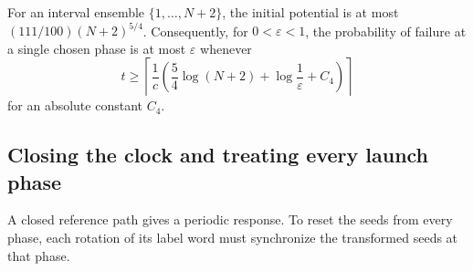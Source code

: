 For an interval ensemble $\{1,\ldots,N+2\}$, the initial potential
is at most $(111/100)(N+2)^{5/4}$. Consequently, for
$0<\varepsilon<1$, the probability of failure at a single chosen
phase is at most $\varepsilon$ whenever
\[
 t\ge\left\lceil\frac1c\left(\frac54\log(N+2)
                    +\log\frac1\varepsilon+C_4\right)\right\rceil
\]
for an absolute constant $C_4$.

\subsection{Closing the clock and treating every launch phase}

A closed reference path gives a periodic response. To reset the seeds
from every phase, each rotation of its label word must synchronize the
transformed seeds at that phase.

